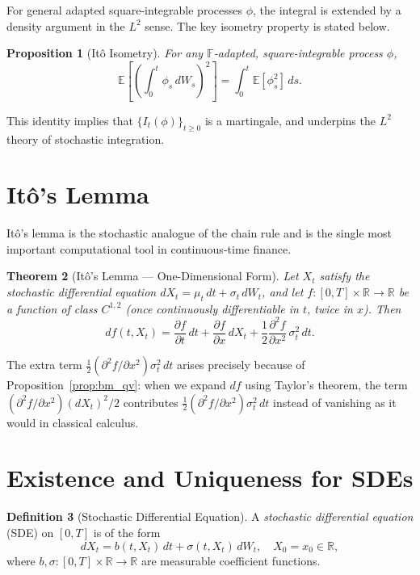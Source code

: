\documentclass[12pt, a4paper, oneside]{report}
\theoremstyle{plain}
\newtheorem{theorem}{Theorem}[chapter]
\newtheorem{proposition}[theorem]{Proposition}
\theoremstyle{definition}
\newtheorem{definition}[theorem]{Definition}
\theoremstyle{remark}
\newcommand{\R}{\mathbb{R}}
\newcommand{\E}{\mathbb{E}}
\begin{document}
For general adapted square-integrable processes $\phi$, the integral is extended
by a density argument in the $L^2$ sense.  The key isometry property is stated below.

\begin{proposition}[It\^{o} Isometry]
For any $\mathbb{F}$-adapted, square-integrable process $\phi$,
\[
  \E\!\left[\left(\int_0^t \phi_s \,dW_s\right)^{\!2}\right]
  = \int_0^t \E[\phi_s^2]\, ds.
\]
\end{proposition}

This identity implies that $\{I_t(\phi)\}_{t \geq 0}$ is a martingale,
and underpins the $L^2$ theory of stochastic integration.

\section{It\^{o}'s Lemma}

It\^{o}'s lemma is the stochastic analogue of the chain rule and is the single
most important computational tool in continuous-time finance.

\begin{theorem}[It\^{o}'s Lemma --- One-Dimensional Form]
\label{thm:ito}
Let $X_t$ satisfy the stochastic differential equation
$dX_t = \mu_t\,dt + \sigma_t\,dW_t$,
and let $f : [0,T] \times \R \to \R$ be a function of class $C^{1,2}$
(once continuously differentiable in $t$, twice in $x$).  Then
\begin{equation}
\label{eq:ito}
  df(t, X_t) = \frac{\partial f}{\partial t}\,dt
  + \frac{\partial f}{\partial x}\,dX_t
  + \frac{1}{2}\frac{\partial^2 f}{\partial x^2}\,\sigma_t^2\,dt.
\end{equation}
\end{theorem}

The extra term $\frac{1}{2}(\partial^2 f/\partial x^2)\sigma_t^2\,dt$ arises
precisely because of Proposition~\ref{prop:bm_qv}: when we expand $df$ using
Taylor's theorem, the term $(\partial^2 f/\partial x^2)(dX_t)^2/2$ contributes
$\frac{1}{2}(\partial^2 f/\partial x^2)\sigma_t^2\,dt$ instead of vanishing as
it would in classical calculus.

\section{Existence and Uniqueness for SDEs}

\begin{definition}[Stochastic Differential Equation]
A \emph{stochastic differential equation} (SDE) on $[0,T]$ is of the form
\begin{equation}
\label{eq:sde}
  dX_t = b(t, X_t)\,dt + \sigma(t, X_t)\,dW_t,
  \quad X_0 = x_0 \in \R,
\end{equation}
where $b, \sigma : [0,T] \times \R \to \R$ are measurable coefficient functions.
\end{definition}
\end{document}
